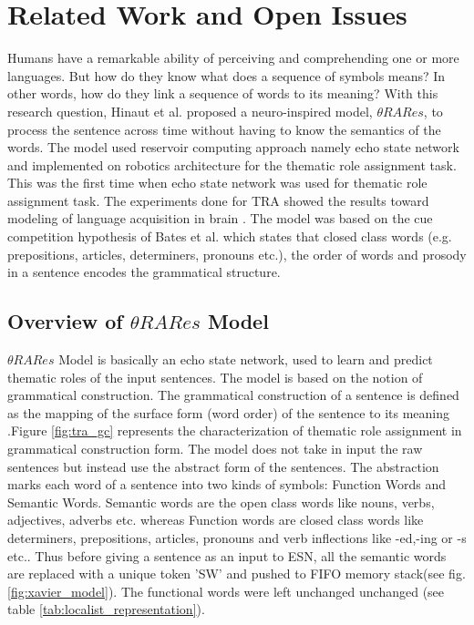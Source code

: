 \chapter{Related Work and Open Issues}\label{issues}

Humans have a remarkable ability of perceiving and comprehending one or more languages. But how do they know what does a sequence of symbols means? In other words, how do they link a sequence of words to its meaning? With this research question, Hinaut et al. \cite{xavier:2013:RT} proposed a neuro-inspired model, $\theta RARes$, to process the sentence across time without having to know the semantics of the words. The model used reservoir computing approach namely echo state network and implemented on robotics architecture \cite{tra:xavier_hri} for the thematic role assignment task. This was the first time when echo state network was used for thematic role assignment task. The experiments done for TRA showed the results toward modeling of language acquisition in brain \cite{tra:xavier_wermter:2014,xavier:2013:RT}. The model was based on the cue competition hypothesis of Bates et al. \cite{tra:bates:1982} which states that closed class words (e.g. prepositions, articles, determiners, pronouns etc.), the order of words and prosody in a sentence encodes the grammatical structure. 

\section{Overview of $\theta RARes$ Model}\label{sec:xavier_model}

$\theta RARes$ Model is basically an echo state network, used to learn and predict thematic roles of the input sentences. The model is based on the notion of grammatical construction. The grammatical construction of a sentence is defined as the mapping of the surface form (word order) of the sentence to its meaning \cite{gc:goldberg:1995}.Figure \ref{fig:tra_gc} represents the characterization of thematic role assignment in grammatical construction form. The model does not take in input the raw sentences but instead use the abstract form of the sentences. The abstraction marks each word of a sentence into two kinds of symbols: Function Words and Semantic Words. Semantic words are the open class words like nouns, verbs, adjectives, adverbs etc. whereas Function words are closed class words like determiners, prepositions, articles, pronouns and verb inflections like -ed,-ing or -s etc.. Thus before giving a sentence as an input to ESN, all the semantic words are replaced with a unique token 'SW' and pushed to FIFO memory stack(see fig. \ref{fig:xavier_model}). The functional words were left unchanged unchanged (see table \ref{tab:localist_representation}).

